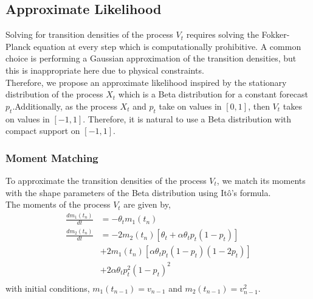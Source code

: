 \documentclass[ima, 20pt, portrait, plainboxedsections]{sciposter}
\newcommand{\E}{\mathbb{E}}
\newcommand{\V}{\mathbb{V}}
\begin{document}
\begin{multicols}{3}
\subsection*{Approximate Likelihood}
Solving for transition densities of the process $V_t$ requires solving the Fokker-Planck equation at every step which is computationally prohibitive. A common choice is performing a  Gaussian approximation of the transition densities, but this is inappropriate here due to physical constraints. \\

Therefore, we propose an approximate likelihood inspired by the stationary distribution of the process $X_t$ which is a Beta distribution for a constant forecast $p_t$.Additionally,  as the process $X_t$ and $p_t$ take on values in $[0,1]$, then $V_t$ takes on values in $[-1,1]$. Therefore,  it is natural to use a  Beta distribution with compact support on $[-1,1]$.

%

\subsubsection*{ Moment Matching}
To approximate the transition densities of  the process $V_t$, we match its moments with the shape parameters of the Beta distribution using It\^{o}'s formula. \\

The moments of the process $V_t$ are given by,
\begin{equation}
\begin{split}
 \frac{dm_1(t_n)}{dt} &=    - \theta_t m_1(t_n)  \\
\frac{d m_{2}(t_n)}{dt}&= -2m_{2}(t_n) [\theta_t + \alpha \theta_t p_t(1-p_t) ] \\
&+ 2m_{1}(t_n)[\alpha \theta_t p_t (1-p_t) (1-2p_t)] \\
&+ 2\alpha \theta_t p_t^2(1-p_t)^2  \\
\end{split}
\end{equation}
with initial conditions, $m_1(t_{n-1})= v_{n-1}$ and $m_2(t_{n-1})= v_{n-1}^2$.




\end{multicols}
\end{document}
